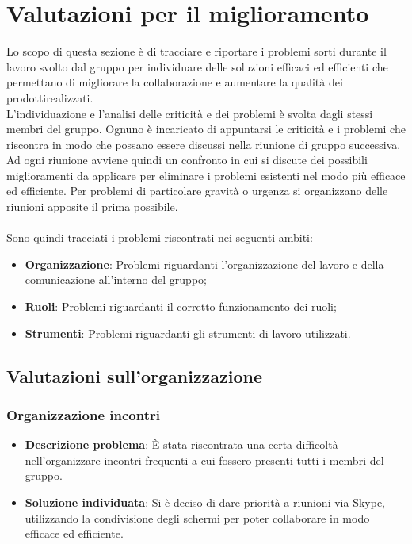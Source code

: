 \section{Valutazioni per il miglioramento} 
Lo scopo di questa sezione è di tracciare e riportare i problemi sorti durante il lavoro svolto dal gruppo per individuare delle soluzioni efficaci ed efficienti che permettano di migliorare la collaborazione e aumentare la qualità dei prodotti\glosp realizzati.
\\L'individuazione e l'analisi delle criticità e dei problemi è svolta dagli stessi membri del gruppo. Ognuno è incaricato di appuntarsi le criticità e i problemi che riscontra in modo che possano essere discussi nella riunione di gruppo successiva. Ad ogni riunione avviene quindi un confronto in cui si discute dei possibili miglioramenti da applicare per eliminare i problemi esistenti nel modo più efficace ed efficiente. Per problemi di particolare gravità o urgenza si organizzano delle riunioni apposite il prima possibile.
\\ \\Sono quindi tracciati i problemi riscontrati nei seguenti ambiti:

\begin{itemize}
	\item \textbf{Organizzazione}: Problemi riguardanti l'organizzazione del lavoro e della comunicazione all'interno del gruppo;
	\item \textbf{Ruoli}: Problemi riguardanti il corretto funzionamento dei ruoli;
	\item \textbf{Strumenti}: Problemi riguardanti gli strumenti di lavoro utilizzati.
\end{itemize}

\subsection{Valutazioni sull'organizzazione}
	\subsubsection{Organizzazione incontri}
		\begin{itemize}
			\item \textbf{Descrizione problema}: È stata riscontrata una certa difficoltà nell'organizzare incontri frequenti a cui fossero presenti tutti i membri del gruppo.
			\item \textbf{Soluzione individuata}: Si è deciso di dare priorità a riunioni via Skype, utilizzando la condivisione degli schermi per poter collaborare in modo efficace ed efficiente.
		\end{itemize}
